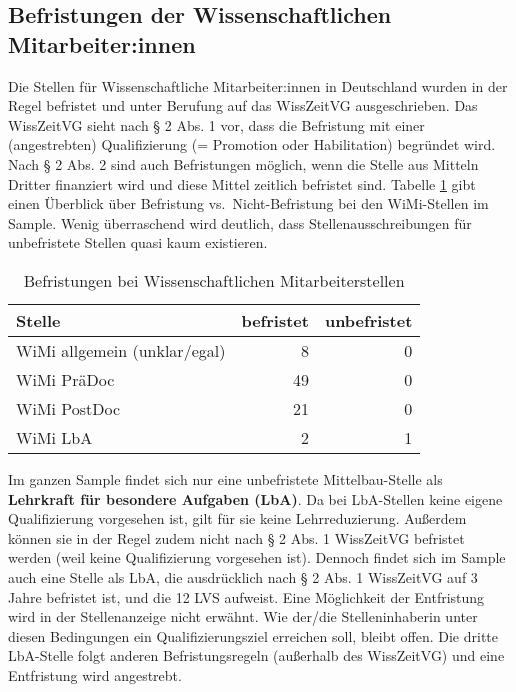 \documentclass[
]{article}
\begin{document}
\hypertarget{befristungen-der-wissenschaftlichen-mitarbeiterinnen}{%
\subsection{Befristungen der Wissenschaftlichen Mitarbeiter:innen}\label{befristungen-der-wissenschaftlichen-mitarbeiterinnen}}

Die Stellen für Wissenschaftliche Mitarbeiter:innen in Deutschland wurden in der Regel befristet und unter Berufung auf das WissZeitVG ausgeschrieben. Das WissZeitVG sieht nach § 2 Abs. 1 vor, dass die Befristung mit einer (angestrebten) Qualifizierung (= Promotion oder Habilitation) begründet wird. Nach § 2 Abs. 2 sind auch Befristungen möglich, wenn die Stelle aus Mitteln Dritter finanziert wird und diese Mittel zeitlich befristet sind. Tabelle \ref{tab:limits} gibt einen Überblick über Befristung vs.~Nicht-Befristung bei den WiMi-Stellen im Sample. Wenig überraschend wird deutlich, dass Stellenausschreibungen für unbefristete Stellen quasi kaum existieren.

\begin{table}[H]

\caption{\label{tab:limits}Befristungen bei Wissenschaftlichen Mitarbeiterstellen}
\centering
\begin{tabular}[t]{l|r|r}
\hline
Stelle & befristet & unbefristet\\
\hline
WiMi allgemein (unklar/egal) & 8 & 0\\
\hline
WiMi PräDoc & 49 & 0\\
\hline
WiMi PostDoc & 21 & 0\\
\hline
WiMi LbA & 2 & 1\\
\hline
\end{tabular}
\end{table}

Im ganzen Sample findet sich nur eine unbefristete Mittelbau-Stelle als \textbf{Lehrkraft für besondere Aufgaben (LbA)}. Da bei LbA-Stellen keine eigene Qualifizierung vorgesehen ist, gilt für sie keine Lehrreduzierung. Außerdem können sie in der Regel zudem nicht nach § 2 Abs. 1 WissZeitVG befristet werden (weil keine Qualifizierung vorgesehen ist). Dennoch findet sich im Sample auch eine Stelle als LbA, die ausdrücklich nach § 2 Abs. 1 WissZeitVG auf 3 Jahre befristet ist, und die 12 LVS aufweist. Eine Möglichkeit der Entfristung wird in der Stellenanzeige nicht erwähnt. Wie der/die Stelleninhaberin unter diesen Bedingungen ein Qualifizierungsziel erreichen soll, bleibt offen. Die dritte LbA-Stelle folgt anderen Befristungsregeln (außerhalb des WissZeitVG) und eine Entfristung wird angestrebt.
\end{document}
